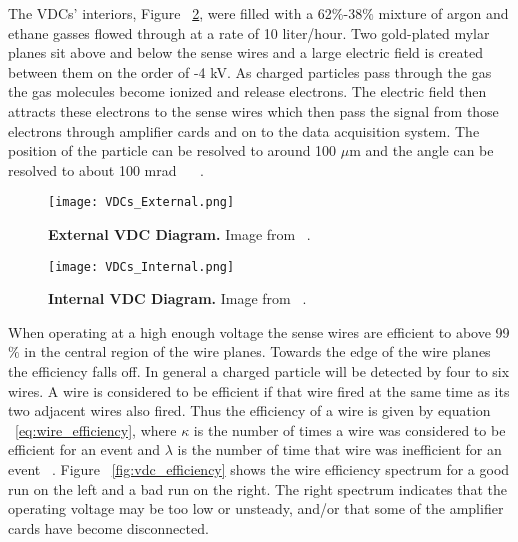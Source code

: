 The VDCs' interiors, Figure ~\ref{fig:vdcs_interior}, were filled with a 62$\%$-38$\%$ mixture of argon and ethane gasses flowed through at a rate of 10 liter/hour. Two gold-plated mylar planes sit above and below the sense wires and a large electric field is created between them on the order of -4 kV. As charged particles pass through the gas the gas molecules become ionized and release electrons. The electric field then attracts these electrons to the sense wires which then pass the signal from those electrons through amplifier cards and on to the data acquisition system. The position of the particle can be resolved to around 100 $\mu$m and the angle can be resolved to about 100 mrad ~\cite{Article:VDCs} ~\cite{Thesis:Ye}.

\begin{figure}[!ht]
\begin{center}
\texttt{[image: VDCs\_External.png]}
\end{center}
\caption[External VDC Diagram]{
{\bf{External VDC Diagram.}} Image from ~\cite{Article:VDCs}.}
\label{fig:vdcs_exterior}
\end{figure}

\begin{figure}[!ht]
\begin{center}
\texttt{[image: VDCs\_Internal.png]}
\end{center}
\caption[Internal VDC Diagram]{
{\bf{Internal VDC Diagram.}} Image from ~\cite{Article:VDCs}.}
\label{fig:vdcs_interior}
\end{figure}

When operating at a high enough voltage the sense wires are efficient to above 99$\%$ in the central region of the wire planes. Towards the edge of the wire planes the efficiency falls off. In general a charged particle will be detected by four to six wires. A wire is considered to be efficient if that wire fired at the same time as its two adjacent wires also fired. Thus the efficiency of a wire is given by equation ~\ref{eq:wire_efficiency}, where $\kappa$ is the number of times a wire was considered to be efficient for an event and $\lambda$ is the number of time that wire was inefficient for an event ~\cite{Article:VDCs}. Figure ~\ref{fig:vdc_efficiency} shows the wire efficiency spectrum for a good run on the left and a bad run on the right. The right spectrum indicates that the operating voltage may be too low or unsteady, and/or that some of the amplifier cards have become disconnected.

